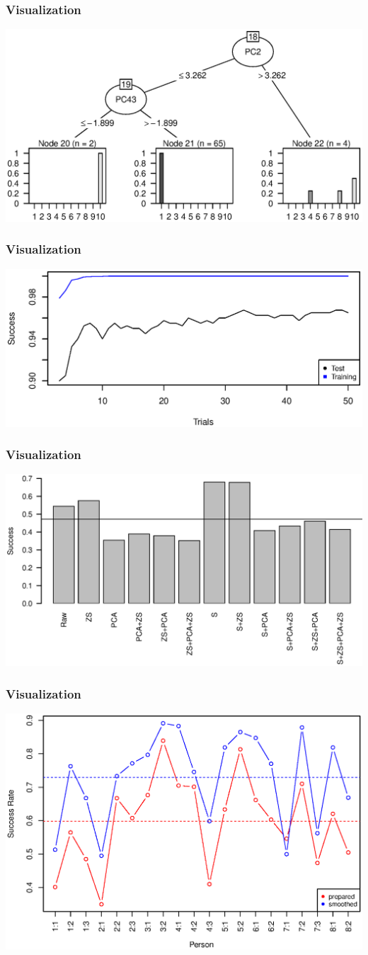 
\begin{frame}
\frametitle{Visualization}
\includegraphics[width = 0.9 \textwidth]{graphics/tree_section}
\end{frame}

\begin{frame}
\frametitle{Visualization}
\includegraphics[width = 0.9 \textwidth]{graphics/tree_boost_overfitting}
\end{frame}

\begin{frame}
\frametitle{Visualization}
\includegraphics[width = 0.9 \textwidth]{graphics/tree_total_all}
\end{frame}

\begin{frame}
\frametitle{Visualization}
\includegraphics[width = 0.9 \textwidth]{graphics/tree_performance_all_combined}
\end{frame}
